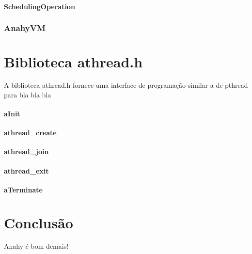 \documentclass[12pt]{article}
\begin{document}
\paragraph{SchedulingOperation} 


\subsubsection{AnahyVM} 



\section{Biblioteca athread.h} %
\label{sec:athread}

A biblioteca athread.h fornece uma interface de programação similar a de pthread para  bla bla bla

\paragraph{aInit}

\paragraph{athread\_create}

\paragraph{athread\_join}

\paragraph{athread\_exit}

\paragraph{aTerminate}


\section{Conclusão} %
\label{sec:conclusao}

Anahy é bom demais!




\end{document}
